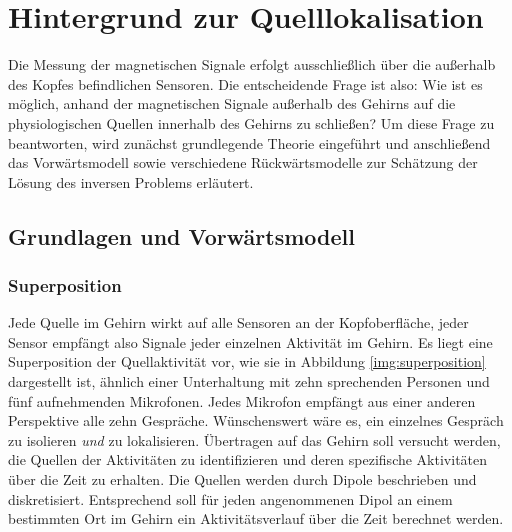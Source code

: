 \documentclass[doc,a4paper,12pt]{apa6}
\begin{document}

\section{Hintergrund zur Quelllokalisation}
\label{sec:hinter}

Die Messung der magnetischen Signale erfolgt ausschließlich über die außerhalb des Kopfes befindlichen Sensoren. Die entscheidende Frage ist also: Wie ist es möglich, anhand der magnetischen Signale außerhalb des Gehirns auf die physiologischen Quellen innerhalb des Gehirns zu schließen? Um diese Frage zu beantworten, wird zunächst grundlegende Theorie eingeführt und anschließend das Vorwärtsmodell sowie verschiedene Rückwärtsmodelle zur Schätzung der Lösung des inversen Problems erläutert.


\subsection{Grundlagen und Vorwärtsmodell}

\subsubsection{Superposition}

Jede Quelle im Gehirn wirkt auf alle Sensoren an der Kopfoberfläche, jeder Sensor empfängt also Signale jeder einzelnen Aktivität im Gehirn. Es liegt eine Superposition der Quellaktivität vor, wie sie in Abbildung \ref{img:superposition} dargestellt ist, ähnlich einer Unterhaltung mit zehn sprechenden Personen und fünf aufnehmenden Mikrofonen. Jedes Mikrofon empfängt aus einer anderen Perspektive alle zehn Gespräche. Wünschenswert wäre es, ein einzelnes Gespräch zu isolieren \emph{und} zu lokalisieren. Übertragen auf das Gehirn soll versucht werden, die Quellen der Aktivitäten zu identifizieren und deren spezifische Aktivitäten über die Zeit zu erhalten. Die Quellen werden durch Dipole beschrieben und diskretisiert. Entsprechend soll für jeden angenommenen Dipol an einem bestimmten Ort im Gehirn ein Aktivitätsverlauf über die Zeit berechnet werden.
\end{document}
